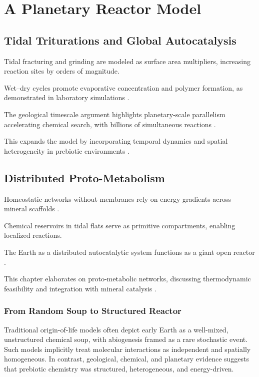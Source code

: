 \documentclass[openany]{book}
\begin{document}
\part{A Planetary Reactor Model}

\chapter{Tidal Triturations and Global Autocatalysis}
Tidal fracturing and grinding are modeled as surface area multipliers, increasing reaction sites by orders of magnitude.

Wet–dry cycles promote evaporative concentration and polymer formation, as demonstrated in laboratory simulations \citep{toppozada2021}.

The geological timescale argument highlights planetary-scale parallelism accelerating chemical search, with billions of simultaneous reactions \citep{plum2025}.

This expands the model by incorporating temporal dynamics and spatial heterogeneity in prebiotic environments \citep{barge2022}.

\chapter{Distributed Proto-Metabolism}
Homeostatic networks without membranes rely on energy gradients across mineral scaffolds \citep{adam2012}.

Chemical reservoirs in tidal flats serve as primitive compartments, enabling localized reactions.

The Earth as a distributed autocatalytic system functions as a giant open reactor \citep{hordijk2013}.

This chapter elaborates on proto-metabolic networks, discussing thermodynamic feasibility and integration with mineral catalysis \citep{gan2024}.

\section{From Random Soup to Structured Reactor}
Traditional origin-of-life models often depict early Earth as a well-mixed, unstructured chemical soup, with abiogenesis framed as a rare stochastic event. Such models implicitly treat molecular interactions as independent and spatially homogeneous. In contrast, geological, chemical, and planetary evidence suggests that prebiotic chemistry was structured, heterogeneous, and energy-driven.
\end{document}
